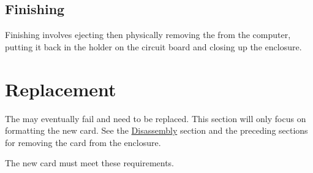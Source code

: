 \subsection{Finishing}

Finishing involves ejecting then physically removing the  from the
computer, putting it back in the holder on the circuit board and closing up the
enclosure.

\fi

\pagebreak
\section{Replacement} \label{Replace SD Card}

The  may eventually fail and need to be replaced.  This section will
only focus on formatting the new card.  See the
\hyperref[Disassembly]{Disassembly} section and the preceding sections for
removing the card from the enclosure.

\par\medskip

The new card must meet these requirements.

